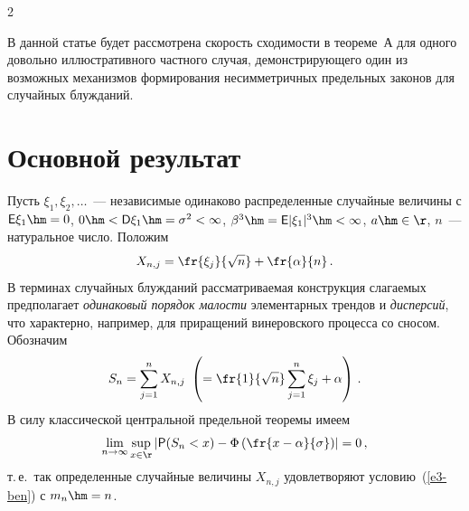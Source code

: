 \begin{multicols}{2}
\smallskip

В данной статье будет рассмотрена скорость сходимости в теореме~А
для одного довольно ил\-люст\-ра\-тив\-но\-го частного случая,
демонстрирующего один из возможных механизмов формирования
несимметричных предельных законов для случайных блужданий.

\section{Основной результат}

Пусть $\xi_1,\xi_2,\ldots$~--- независимые одинаково распределенные
случайные величины с ${\sf E}\xi_1\hm=0$, $0\hm<{\sf
D}\xi_1\hm=\sigma^2<\infty$, $\beta^3\hm={\sf E}|\xi_1|^3\hm<\infty$,
$a\hm\in\r$, $n$~--- натуральное число. Положим
$$
X_{n,j}=\fr{\xi_j}{\sqrt{n}}+\fr {\alpha}{n}\,.
$$
В терминах случайных блужданий рассматриваемая конструкция слагаемых
предполагает {\it одинаковый порядок малости} элементарных трендов и
{\it дис\-пер\-сий}, что характерно, например, для приращений
винеровского процесса со сносом. Обозначим
$$
S_n=\sum\limits_{j=1}^n X_{n,j}\
\left(=\fr{1}{\sqrt{n}}\sum\limits_{j=1}^n\xi_j+\alpha\right)\,.
$$
В силу классической центральной предельной теоремы имеем
$$
\lim_{n\to\infty}\sup\limits_{x\in\r}\left\vert{\sf
P}(S_n<x)-\Phi\left(\fr{x-\alpha}{\sigma}\right)\right\vert=0\,,
$$
т.\,е.\ так определенные случайные величины $X_{n,j}$ удовлетворяют
условию~(\ref{e3-ben}) с $m_n\hm=n$.


\end{multicols}

